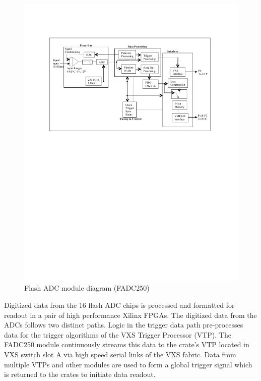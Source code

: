 \begin{figure}[hbt]
	\centering
	\includegraphics[width=1.0\columnwidth,keepaspectratio]{img/FADC250_Diagram.pdf}
	\caption{Flash ADC module diagram (FADC250)}
	\label{fig:FADC250_board}
\end{figure}

Digitized data from the 16 flash ADC chips is processed and formatted for readout in a pair of high performance Xilinx FPGAs. The digitized data from the ADCs follows two distinct paths.  Logic in the trigger data path pre-processes data for the trigger algorithms of the VXS Trigger Processor (VTP). The FADC250 module continuously streams this data to the crate’s VTP located in VXS switch slot A via high speed serial links of the VXS fabric.  Data from multiple VTPs and other modules are used to form a global trigger signal which is returned to the crates to initiate data readout.

